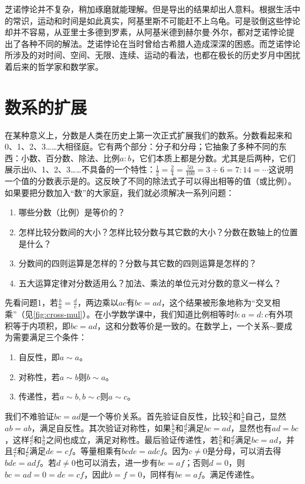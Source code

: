 \documentclass[b5paper]{ctexart}
\begin{document}
\begin{mdframed}
芝诺悖论并不复杂，稍加琢磨就能理解。但是导出的结果却出人意料。根据生活中的常识，运动和时间是如此真实，阿基里斯不可能赶不上乌龟。可是驳倒这些悖论却并不容易，从亚里士多德到罗素，从阿基米德到赫尔曼$\cdot$外尔，都对芝诺悖论提出了各种不同的解法\cite{Britannica-Zeno-24}。芝诺悖论在当时曾给古希腊人造成深深的困惑。而芝诺悖论所涉及的对时间、空间、无限、连续、运动的看法，也都在极长的历史岁月中困扰着后来的哲学家和数学家。
\end{mdframed}

\section{数系的扩展}
在某种意义上，分数是人类在历史上第一次正式扩展我们的数系。分数看起来和0、1、2、3……大相径庭。它有两个部分：分子和分母；它抽象了多种不同的东西：小数、百分数、除法、比例$a:b$，它们本质上都是分数。尤其是后两种，它们展示出0、1、2、3……不具备的一个特性：$\frac{1}{2} = \frac{2}{4} = \frac{50}{100} = 3 \div 6 = 7:14 = \cdots$这说明一个值的分数表示是的。这反映了不同的除法式子可以得出相等的值（或比例）。如果要把分数加入“数”的大家庭，我们就必须解决一系列问题：

\begin{enumerate}[问题1.]
\item 哪些分数（比例）是等价的？
\item 怎样比较分数间的大小？怎样比较分数与其它数的大小？分数在数轴上的位置是什么？
\item 分数间的四则运算是怎样的？分数与其它数的四则运算是怎样的？
\item 五大运算定律对分数适用么？加法、乘法的单位元对分数的意义一样么？
\end{enumerate}

先看问题1，若$\frac{b}{a} = \frac{d}{c}$，两边乘以$ac$有$bc = ad$，这个结果被形象地称为“交叉相乘”（见\cref{fig:cross-mul}）。在小学数学课中，我们知道比例相等时$b : a = d : c$有外项积等于内项积，即$bc = ad$，这和分数等价是一致的。在数学上，一个关系$\sim$要成为需要满足三个条件：

\begin{enumerate}[条件1.]
\item 自反性，即$a \sim a$。
\item 对称性，若$a \sim b$则$b \sim a$。
\item 传递性，若$a \sim b, b \sim c$则$a \sim c$。
\end{enumerate}

我们不难验证$bc = ad$是一个等价关系。首先验证自反性，比较$\frac{b}{a}$和$\frac{b}{a}$自己，显然$ab = ab$，满足自反性。其次验证对称性，如果$\frac{b}{a}$和$\frac{d}{c}$满足$bc = ad$，显然也有$ad = bc$，这样$\frac{d}{c}$和$\frac{b}{a}$之间也成立，满足对称性。最后验证传递性，若$\frac{b}{a}$和$\frac{d}{c}$满足$bc = ad$，并且$\frac{d}{c}$和$\frac{f}{e}$满足$de = cf$。等量相乘有$bcde = adcf$。因为$c \ne 0$是分母，可以消去得$bde = adf$。若$d \ne 0$也可以消去，进一步有$be = af$；否则$d = 0$，则$bc = ad = 0 = de = cf$，因此$b = f = 0$，同样有$be = af$。满足传递性。
\end{document}
